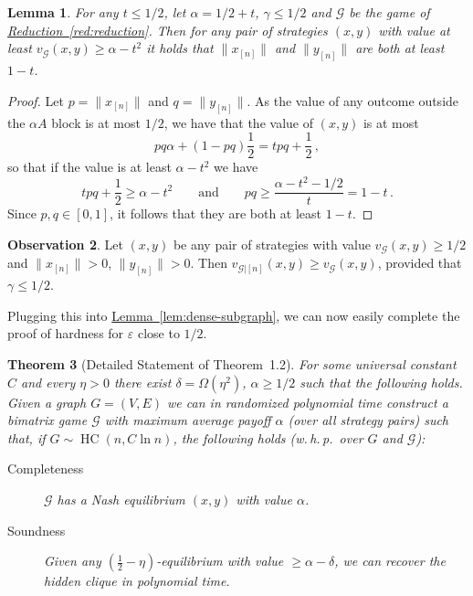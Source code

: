 \documentclass[10pt]{article}
\newtheorem{theorem}{Theorem}[section]
\newtheorem{lemma}[theorem]{Lemma}
\theoremstyle{definition}
\numberwithin{equation}{section}
\newcommand{\expref}[2]{\texorpdfstring{\hyperref[#2]{#1~\ref{#2}}}{#1~\ref{#2}}}
\newcommand{\eps}{\varepsilon}
\newcommand{\G}{\mathcal{G}}
\newcommand{\HC}[2]{\operatorname{HC}(#1,#2)}
\newtheorem{observation}[theorem]{Observation}
\begin{document}
\begin{lemma}
  \label{lem:weight-in-A}
  For any $t \le 1/2$, let $\alpha = {1}/{2} + t$, $\gamma \le {1}/{2}$ and $\G$ be the game of
  \expref{Reduction}{red:reduction}.  Then for any pair of strategies
  $(x,y)$ with value at least $v_\G(x,y) \ge \alpha - t^2$ it holds
  that $\|x_{[n]}\|$ and $\|y_{[n]}\|$ are both at least $1 - t$.
\end{lemma}

\begin{proof}
  Let $p = \|x_{[n]}\|$ and $q = \|y_{[n]}\|$.  As the value of any
  outcome outside the $\alpha A$ block is at most ${1}/{2}$, we have that
  the value of $(x,y)$ is at most
  $$pq \alpha + (1-pq) \frac{1}{2} = t pq + \frac{1}{2}\,,$$
  so that if the value is at least $\alpha - t^2$ we have
  \[
  t pq + \frac{1}{2} \ge \alpha - t^2 \qquad\text{and}\qquad
  pq \ge \frac{\alpha - t^2 - 1/2}{t} = 1-t\,.
  \]
  Since $p, q \in [0,1]$, it follows that they are both at least
  $1-t$.
%
\end{proof}

\begin{observation}
  \label{obs:value-after-condition}
  Let $(x,y)$ be any pair of strategies with value $v_{\G}(x,y) \ge
  {1}/{2}$ and $\|x_{[n]}\| > 0$, $\|y_{[n]}\| > 0$.  Then
  $v_{\G|[n]}(x,y) \ge v_{\G}(x,y)$, provided that $\gamma \le {1}/{2}$.
\end{observation}

Plugging this into \expref{Lemma}{lem:dense-subgraph}, we can now easily
complete the proof of hardness for $\eps$ close to ${1}/{2}$.

\begin{theorem}[Detailed Statement of Theorem~1.2]
  \label{thm:eps-hardness-formal}
  For some universal constant $C$ and every $\eta>0$ there exist $\delta = \Omega(\eta^2)$, $\alpha
  \ge {1}/{2}$ such
  that the following holds.  Given a graph $G = (V,E)$ we can
  in randomized polynomial time construct a bimatrix game $\G$ with maximum average payoff $\alpha$ (over all strategy pairs) such
  that, if $G\sim\HC{n}{C\ln n}$, %
 the following holds (w.\,h.\,p.\ over $G$ and $\G$):
  \begin{description}
  \item[Completeness] %
%
    $\G$ has a Nash equilibrium
    $(x,y)$ with value $\alpha$.
  \item[Soundness]  %
%
 Given any $(\frac{1}{2}-\eta)$-equilibrium with value $\geq\alpha-\delta$, we can recover the hidden clique in polynomial time.
  \end{description}
\end{theorem}
\end{document}

